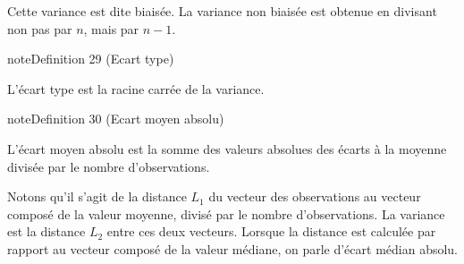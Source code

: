 \documentclass[letterpaper,10pt,english]{jupyterBook}
\begin{document}
\sphinxAtStartPar
Cette variance est dite biaisée. La variance non biaisée est obtenue en divisant non pas par \(n\), mais par \(n-1\).
\label{statsdescriptives:definition-13}
\begin{sphinxadmonition}{note}{Definition 29 (Ecart type)}



\sphinxAtStartPar
L’écart type est la racine carrée de la variance.
\end{sphinxadmonition}
\label{statsdescriptives:definition-14}
\begin{sphinxadmonition}{note}{Definition 30 (Ecart moyen absolu)}



\sphinxAtStartPar
L’écart moyen absolu est la somme des valeurs absolues des écarts à la moyenne divisée par le nombre d’observations.
\end{sphinxadmonition}

\sphinxAtStartPar
Notons qu’il s’agit de la distance \(L_1\) du vecteur des observations au vecteur composé de la valeur moyenne, divisé par le nombre d’observations. La variance est la distance \(L_2\) entre ces deux vecteurs. Lorsque la distance est calculée par rapport au vecteur composé de la valeur médiane, on parle d’écart médian absolu.

\sphinxAtStartPar
{}
\end{document}

